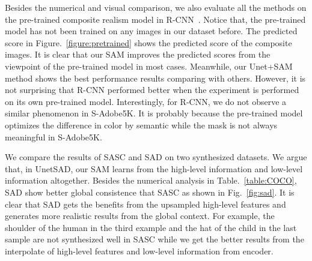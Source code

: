 Besides the numerical and visual comparison, we also evaluate all the methods on the pre-trained composite realism model in R-CNN~\cite{Zhu:2015tl}. Notice that, the pre-trained model has not been trained on any images in our dataset before. The predicted score in Figure.~\ref{figure:pretrained} shows the predicted score of the composite images. It is clear that our SAM improves the predicted scores from the viewpoint of the pre-trained model in most cases. Meanwhile, our Unet+SAM method shows the best performance results comparing with others. However, it is not surprising that R-CNN performed better when the experiment is performed on its own pre-trained model. Interestingly, for R-CNN, we do not observe a similar phenomenon in S-Adobe5K. It is probably because the pre-trained model optimizes the difference in color by semantic while the mask is not always meaningful in S-Adobe5K.

We compare the results of SASC and SAD on two synthesized datasets. We argue that, in UnetSAD, our SAM learns from the high-level information and low-level information altogether. Besides the numerical analysis in Table.~\ref{table:COCO}, SAD show better global consistence that SASC as shown in Fig.~\ref{fig:sad}. It is clear that SAD gets the benefits from the upsampled high-level features and generates more realistic results from the global context. For example, the shoulder of the human in the third example and the hat of the child in the last sample are not synthesized well in SASC while we get the better results from the interpolate of high-level features and low-level information from encoder.

